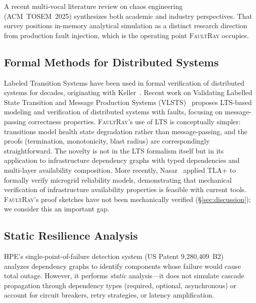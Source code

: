\documentclass[10pt,twocolumn]{article}
\begin{document}
A recent multi-vocal literature review on chaos
engineering~\cite{chaos-mlr-2025} (ACM~TOSEM~2025) synthesizes
both academic and industry perspectives. That survey positions
in-memory analytical simulation as a distinct research direction
from production fault injection, which is the operating point
\textsc{FaultRay} occupies.

\subsection{Formal Methods for Distributed Systems}
\label{sec:rw-formal}
Labeled Transition Systems have been used in formal verification
of distributed systems for decades, originating with
Keller~\cite{keller1976}. Recent work on Validating Labelled
State Transition and Message Production Systems
(VLSTS)~\cite{vlsts2022} proposes LTS-based modeling and
verification of distributed systems with faults, focusing on
message-passing correctness properties. \textsc{FaultRay}'s use
of LTS is conceptually simpler: transitions model health state
degradation rather than message-passing, and the proofs
(termination, monotonicity, blast radius) are correspondingly
straightforward. The novelty is not in the LTS formalism itself
but in its application to infrastructure dependency graphs with
typed dependencies and multi-layer availability composition.
More recently, Nasar~\cite{nasar2026} applied TLA+ to formally verify
microgrid reliability models, demonstrating that mechanical
verification of infrastructure availability properties is feasible
with current tools. \textsc{FaultRay}'s proof sketches have not been
mechanically verified (\S\ref{sec:discussion}); we consider this an
important gap.

\subsection{Static Resilience Analysis}
HPE's single-point-of-failure detection system
(US Patent 9,280,409~B2)~\cite{hpe-spof} analyzes dependency graphs
to identify components whose failure would cause total outage.
However, it performs \emph{static} analysis---it does not simulate
cascade propagation through dependency types (required, optional,
asynchronous) or account for circuit breakers, retry strategies, or
latency amplification.
\end{document}
